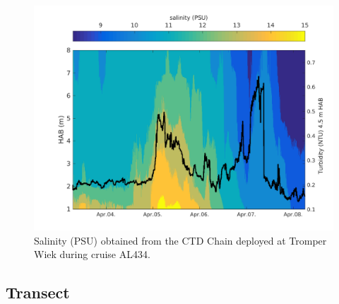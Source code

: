  \begin{figure}[ht]
\includegraphics[width=15cm]{bilder/ctdchaintw.png}
 \caption{Salinity (PSU) obtained from the CTD Chain deployed at Tromper Wiek 
during cruise AL434.}
 \label{ctdchain}
 \end{figure}
 

\subsection{Transect}

